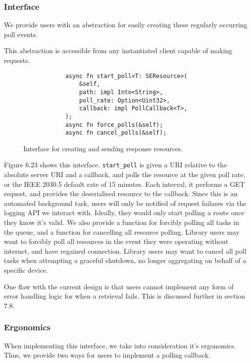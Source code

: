 \subsubsection{Interface}
We provide users with an abstraction for easily creating these regularly occurring poll events.

This abstraction is accessible from any instantiated client capable of making requests.

\begin{figure}[h]
    \begin{center}
        \begin{lstlisting}
            async fn start_poll<T: SEResource>(
                &self,
                path: impl Into<String>,
                poll_rate: Option<Uint32>,
                callback: impl PollCallback<T>,
            );
            async fn force_polls(&self);
            async fn cancel_polls(&self);
        \end{lstlisting}
        \label{fig:pollinterface}
        \vspace{-10pt}
        \caption{Interface for creating and sending response resources.}
    \end{center}
\end{figure}

Figure 6.23 shows this interface. \texttt{start\_poll} is given a URI relative to the absolute server URI and a callback, and polls the resource at the given poll rate, or the IEEE 2030.5 default rate of 15 minutes. Each interval, it performs a GET request, and provides the deserialised resource to the callback. Since this is an automated background task, users will only be notified of request failures via the logging API we interact with. Ideally, they would only start polling a route once they know it's valid.
We also provide a function for forcibly polling all tasks in the queue, and a function for cancelling all resource polling. Library users may want to forcibly poll all resources in the event they were operating without internet, and have regained connection. Library users may want to cancel all poll tasks when attempting a graceful shutdown, no longer aggregating on behalf of a specific device.

One flaw with the current design is that users cannot implement any form of error handling logic for when a retrieval fails. This is discussed further in section 7.8.

\subsubsection{Ergonomics}
When implementing this interface, we take into consideration it's ergonomics. Thus, we provide two ways for users to implement a polling callback.


